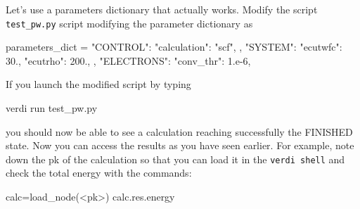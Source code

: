 Let's use a parameters dictionary that actually works.
Modify the script \texttt{test\_pw.py} script modifying the parameter dictionary as
\begin{pythoncommand}
parameters_dict = {
    "CONTROL": {"calculation": "scf",
                },
    "SYSTEM": {"ecutwfc": 30.,
               "ecutrho": 200.,
               },
    "ELECTRONS": {"conv_thr": 1.e-6,
                  }
    }
\end{pythoncommand}

If you launch the modified script by typing
\begin{bashcommand}
 verdi run test_pw.py
\end{bashcommand}
you should now be able to see a calculation reaching successfully the FINISHED state.
Now you can access the results as you have seen earlier.
For example, note down the pk of the calculation so that you can load it in the \texttt{verdi shell} and check the total energy with the commands:
\begin{pythoncommand}
calc=load_node(<pk>)
calc.res.energy
\end{pythoncommand}

% 







